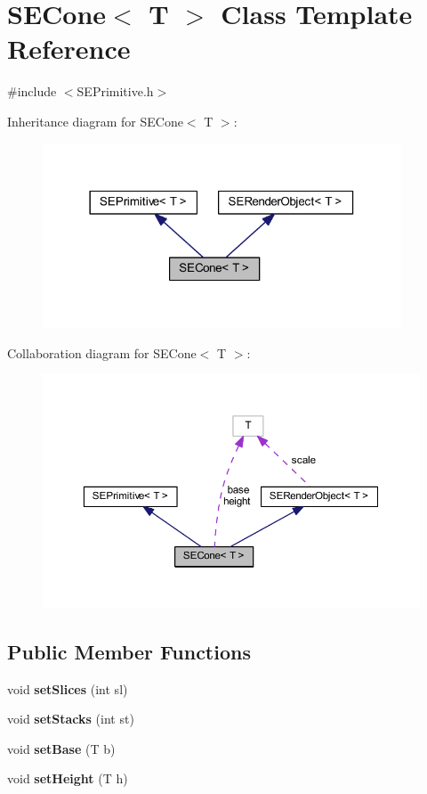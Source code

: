 \section{S\+E\+Cone$<$ T $>$ Class Template Reference}
\label{class_s_e_cone}


{\ttfamily \#include $<$S\+E\+Primitive.\+h$>$}



Inheritance diagram for S\+E\+Cone$<$ T $>$\+:
\nopagebreak
\begin{figure}[H]
\begin{center}
\leavevmode
\includegraphics[width=302pt]{class_s_e_cone__inherit__graph}
\end{center}
\end{figure}


Collaboration diagram for S\+E\+Cone$<$ T $>$\+:
\nopagebreak
\begin{figure}[H]
\begin{center}
\leavevmode
\includegraphics[width=350pt]{class_s_e_cone__coll__graph}
\end{center}
\end{figure}
\subsection*{Public Member Functions}
\begin{DoxyCompactItemize}
\item 
void {\bf set\+Slices} (int sl)
\item 
void {\bf set\+Stacks} (int st)
\item 
void {\bf set\+Base} (T b)
\item 
void {\bf set\+Height} (T h)
\end{DoxyCompactItemize}
